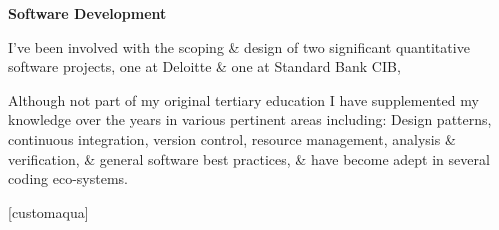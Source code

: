 \documentclass[11pt]{article}
\newenvironment{innerlist}[1][\enskip\textbullet]%
        {\begin{compactitem}[#1]}{\end{compactitem}}
\newcommand{\blankline}{\quad\pagebreak[2]}
\begin{document}
\blankline


\textbf{Software Development}
\blankline

	\begin{innerlist}
		\item I've been involved with the scoping \& design of two significant quantitative software 	
			 projects, one at Deloitte \& one at Standard Bank CIB,
		\item Although not part of my original tertiary education I have supplemented my knowledge over 
			 the years in various pertinent areas including: Design patterns, continuous integration, 
			 version control, resource management, analysis \& verification, \& general software best 
			 practices, \& have become adept in several coding eco-systems.
	\end{innerlist}
\hspace{0pt}\xrfill[0pt]{0.5pt}[customaqua]\hspace{0pt}
\end{document}
